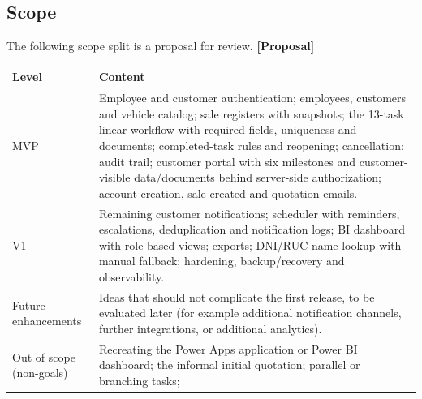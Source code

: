 \documentclass[11pt,a4paper]{article}
\newcommand{\tagprop}{\textcolor{orange!80!black}{\textbf{[Proposal]}}}
\begin{document}
\subsection{Scope}

The following scope split is a proposal for review. \tagprop{}

\begin{longtable}{@{}L{3.0cm}L{12.8cm}@{}}
	\toprule
	\textbf{Level}           & \textbf{Content}                                                                                                                                                                                                                                                                                                                                                                                                         \\
	\midrule
	\endhead
	MVP                      & Employee and customer authentication; employees, customers and vehicle catalog; sale registers with snapshots; the 13-task linear workflow with required fields, uniqueness and documents; completed-task rules and reopening; cancellation; audit trail; customer portal with six milestones and customer-visible data/documents behind server-side authorization; account-creation, sale-created and quotation emails. \\
	V1                       & Remaining customer notifications; scheduler with reminders, escalations, deduplication and notification logs; BI dashboard with role-based views; exports; DNI/RUC name lookup with manual fallback; hardening, backup/recovery and observability.                                                                                                                                                                       \\
	Future enhancements      & Ideas that should not complicate the first release, to be
	evaluated later (for example additional notification channels, further
	integrations, or additional analytics).                                                                                                                                                                                                                                                                                                                                                                                                             \\
	Out of scope (non-goals) & Recreating the Power Apps application or Power BI
	dashboard; the informal initial quotation; parallel or branching tasks;

\end{longtable}
\end{document}
